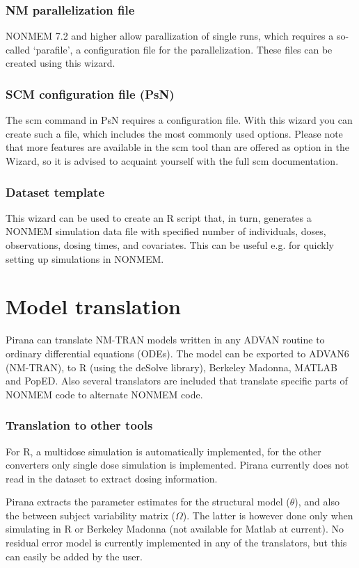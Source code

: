 {{{{\subsubsection*{NM parallelization file}
NONMEM 7.2 and higher allow parallization of single runs, which
requires a so-called `parafile', a configuration file for the
parallelization. These files can be created using this wizard.

\subsubsection*{SCM configuration file (PsN)}
The scm command in PsN requires a configuration file. With this wizard
you can create such a file, which includes the most commonly used
options. Please note that more features are available in the scm tool
than are offered as option in the Wizard, so it is advised to acquaint
yourself with the full scm documentation.

\subsubsection*{Dataset template}
This wizard can be used to create an R script that, in turn, generates
a NONMEM simulation data file with specified number of individuals,
doses, observations, dosing times, and covariates. This can be useful
e.g. for quickly setting up simulations in NONMEM.

\section{Model translation}
Pirana can translate NM-TRAN models written in any ADVAN routine to
ordinary differential equations (ODEs). The model can be exported to
ADVAN6 (NM-TRAN), to R (using the deSolve library), Berkeley Madonna,
MATLAB and PopED. Also several translators are included that
translate specific parts of NONMEM code to alternate NONMEM code.

\subsubsection*{Translation to other tools}
For R, a multidose simulation is automatically implemented, for the
other converters only single dose simulation is implemented. Pirana
currently does not read in the dataset to extract dosing information.

Pirana extracts the parameter estimates for the structural model
($\theta$), and also the between subject variability matrix
($\Omega$). The latter is however done only when simulating in R or Berkeley Madonna (not available for Matlab at current).
No residual error model is currently implemented in any of the translators, but this can easily be added by the user.

}}}}
